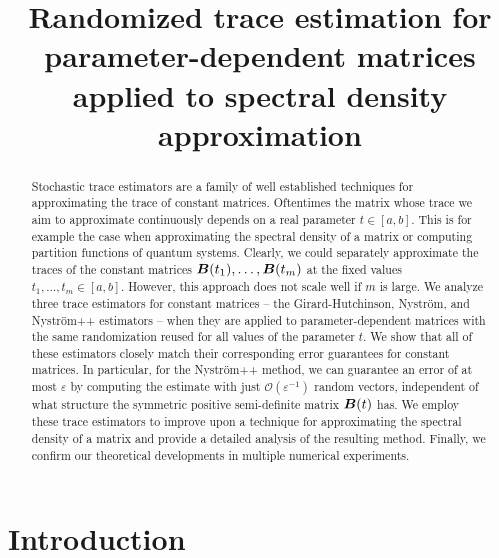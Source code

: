 \documentclass[12pt]{article}
\title{Randomized trace estimation for parameter-dependent matrices applied to spectral density approximation}
\begin{document}
\maketitle



\begin{abstract}
    Stochastic trace estimators are a family of well established techniques for approximating the trace of constant matrices. Oftentimes the matrix whose trace we aim to approximate continuously depends on a real parameter $t \in [a,b]$. This is for example the case when approximating the spectral density of a matrix or computing partition functions of quantum systems. Clearly, we could separately approximate the traces of the constant matrices $\boldsymbol{B}(t_1), \dots, \boldsymbol{B}(t_m)$ at the fixed values $t_1, \dots, t_m \in [a, b]$. However, this approach does not scale well if $m$ is large. We analyze three trace estimators for constant matrices -- the Girard-Hutchinson, Nyström, and Nyström++ estimators -- when they are applied to parameter-dependent matrices with the same randomization reused for all values of the parameter $t$. We show that all of these estimators closely match their corresponding error guarantees for constant matrices. In particular, for the Nyström++ method, we can guarantee an error of at most $\varepsilon$ by computing the estimate with just $\mathcal{O}(\varepsilon^{-1})$ random vectors, independent of what structure the symmetric positive semi-definite matrix $\boldsymbol{B}(t)$ has. We employ these trace estimators to improve upon a technique for approximating the spectral density of a matrix and provide a detailed analysis of the resulting method. Finally, we confirm our theoretical developments in multiple numerical experiments.
\end{abstract}

\section{Introduction}
\label{sec:introduction}
\end{document}
